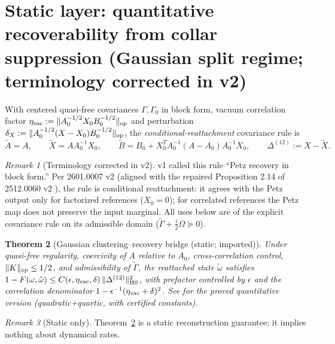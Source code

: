 \documentclass[11pt]{article}
\newtheorem{theorem}{Theorem}[section]
\theoremstyle{remark}
\newtheorem{remark}[theorem]{Remark}
\begin{document}
\section{Static layer: quantitative recoverability from collar suppression
(Gaussian split regime; terminology corrected in v2)}
With centered quasi-free covariances $\Gamma, \Gamma_0$ in block form,
vacuum correlation factor $\eta_{\rm vac} := \|A_0^{-1/2} X_0
B_0^{-1/2}\|_{\rm op}$ and perturbation $\delta_X := \|A_0^{-1/2}(X - X_0)
B_0^{-1/2}\|_{\rm op}$, the \emph{conditional-reattachment} covariance rule
is
\[
\tilde A = A, \qquad \tilde X = A A_0^{-1} X_0, \qquad
\tilde B = B_0 + X_0^T A_0^{-1}(A - A_0)A_0^{-1} X_0,
\qquad \Delta^{(12)} := X - \tilde X .
\]
\begin{remark}[Terminology corrected in v2]
\label{rem:petzfix}
v1 called this rule ``Petz recovery in block form.'' Per 2601.0007 v2
\cite{S0007} (aligned with the repaired Proposition 2.14 of 2512.0060 v2
\cite{S0060}), the rule is conditional reattachment: it agrees with the
Petz output only for factorized references ($X_0 = 0$); for correlated
references the Petz map does not preserve the input marginal. All uses
below are of the explicit covariance rule on its admissible domain
($\tilde\Gamma + \frac{i}{2}\Omega \succeq 0$).
\end{remark}
\begin{theorem}[Gaussian clustering--recovery bridge (static; imported)]
\label{thm:static}
Under quasi-free regularity, coercivity of $A$ relative to $A_0$,
cross-correlation control, $\|K\|_{\rm op} \le 1/2$, and admissibility of
$\tilde\Gamma$, the reattached state $\tilde\omega$ satisfies
$1 - F(\omega, \tilde\omega) \le C(\epsilon, \eta_{\rm vac}, \delta)\,
\|\Delta^{(12)}\|_{\rm HS}^2$, with prefactor controlled by $\epsilon$ and
the correlation denominator $1 - \epsilon^{-1}(\eta_{\rm vac} +
\delta)^2$. See \cite{S0007} for the proved quantitative version
(quadratic+quartic, with certified constants).
\end{theorem}
\begin{remark}[Static only]
Theorem~\ref{thm:static} is a static reconstruction guarantee; it implies
nothing about dynamical rates.
\end{remark}
\end{document}
